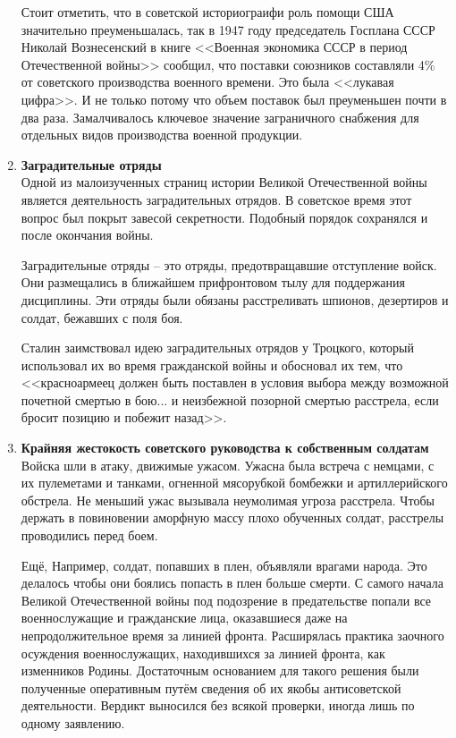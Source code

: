 \documentclass[12pt]{article}
\begin{document}
\begin{enumerate}[label=\textbf{\large\arabic*}]
    Стоит отметить, что в советской историограифи роль помощи США значительно преуменьшалась, так
    в 1947 году председатель Госплана СССР Николай Вознесенский в книге <<Военная экономика СССР в период Отечественной войны>> сообщил,
    что поставки союзников составляли 4\% от советского производства военного времени.
    Это была <<лукавая цифра>>.
    И не только потому что объем поставок был преуменьшен почти в два раза.
    Замалчивалось ключевое значение заграничного снабжения для отдельных видов производства военной продукции.

    \item \textbf{Заградительные отряды} \\
    Одной из малоизученных страниц истории Великой Отечественной войны является деятельность заградительных отрядов.
    В советское время этот вопрос был покрыт завесой секретности.
    Подобный порядок сохранялся и после окончания войны.

    Заградительные отряды -- это отряды, предотвращавшие отступление войск.
    Они размещались в ближайшем прифронтовом тылу для поддержания дисциплины.
    Эти отряды были обязаны расстреливать шпионов, дезертиров и солдат, бежавших с поля боя.

    Сталин заимствовал идею заградительных отрядов у Троцкого, который использовал их во время гражданской войны
    и обосновал их тем, что <<красноармеец должен быть поставлен в условия выбора между возможной почетной смертью в бою...
    и неизбежной позорной смертью расстрела, если бросит позицию и побежит назад>>.

    \item \textbf{Крайняя жестокость советского руководства к собственным солдатам} \\
    Войска шли в атаку, движимые ужасом.
    Ужасна была встреча с немцами, с их пулеметами и танками, огненной мясорубкой бомбежки и артиллерийского обстрела.
    Не меньший ужас вызывала неумолимая угроза расстрела.
    Чтобы держать в повиновении аморфную массу плохо обученных солдат, расстрелы проводились перед боем.

    Ещё, Например, солдат, попавших в плен, объявляли врагами народа.
    Это делалось чтобы они боялись попасть в плен больше смерти.
    С самого начала Великой Отечественной войны под подозрение в предательстве попали все военнослужащие и гражданские лица,
    оказавшиеся даже на непродолжительное время за линией фронта.
    Расширялась практика заочного осуждения военнослужащих, находившихся за линией фронта, как изменников Родины.
    Достаточным основанием для такого решения были полученные оперативным путём сведения об их якобы антисоветской деятельности.
    Вердикт выносился без всякой проверки, иногда лишь по одному заявлению.


\end{enumerate}
\end{document}
